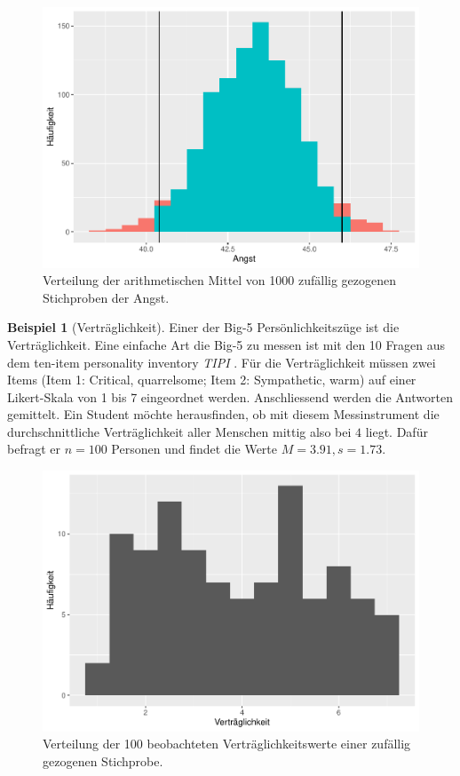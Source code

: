 \documentclass[
]{book}
\theoremstyle{definition}
\theoremstyle{definition}
\newtheorem{example}{Beispiel}[chapter]
\theoremstyle{definition}
\theoremstyle{definition}
\theoremstyle{remark}
\begin{document}
\begin{figure}
\centering
\includegraphics{aps_statistik1_files/figure-latex/exm-angst-hist-means-emp-ci-1.pdf}
\caption{\label{fig:exm-angst-hist-means-emp-ci}Verteilung der arithmetischen Mittel von 1000 zufällig gezogenen Stichproben der Angst.}
\end{figure}

\begin{example}[Verträglichkeit]
\protect\hypertarget{exm:agreableness}{}\label{exm:agreableness}Einer der Big-5 Persönlichkeitszüge ist die Verträglichkeit. Eine einfache Art die Big-5 zu messen ist mit den 10 Fragen aus dem ten-item personality inventory \emph{TIPI} \citep{gosling2003}. Für die Verträglichkeit müssen zwei Items (Item 1: Critical, quarrelsome; Item 2: Sympathetic, warm) auf einer Likert-Skala von 1 bis 7 eingeordnet werden. Anschliessend werden die Antworten gemittelt. Ein Student möchte herausfinden, ob mit diesem Messinstrument die durchschnittliche Verträglichkeit aller Menschen mittig also bei \(4\) liegt. Dafür befragt er \(n = 100\) Personen und findet die Werte \(M=3.91, s = 1.73\).
\end{example}

\begin{figure}
\centering
\includegraphics{aps_statistik1_files/figure-latex/exm-agreableness-hist-1.pdf}
\caption{\label{fig:exm-agreableness-hist}Verteilung der 100 beobachteten Verträglichkeitswerte einer zufällig gezogenen Stichprobe.}
\end{figure}
\end{document}
